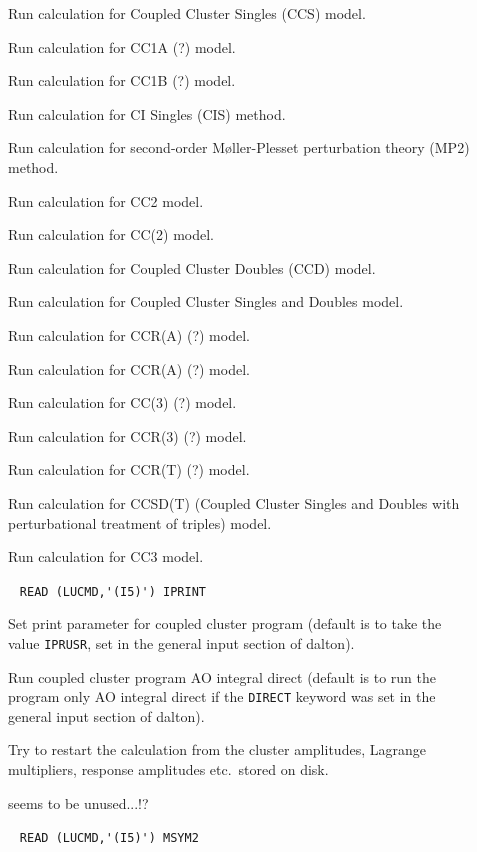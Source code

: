 \begin{description}
\item[] 
        Run calculation for Coupled Cluster Singles (CCS) model. 
%
\item[]   
        Run calculation for CC1A (?) model. 
%
\item[]    
        Run calculation for CC1B (?) model. 
%
\item[]    
        Run calculation for CI Singles (CIS) method. 
%
\item[]    
        Run calculation for second-order M{\o}ller-Plesset 
        perturbation theory (MP2) method. 
%
\item[]    
        Run calculation for CC2 model. 
%
\item[]  
        Run calculation for CC(2) model. 
%
\item[]    
        Run calculation for Coupled Cluster Doubles (CCD) model. 
%
\item[]   
        Run calculation for Coupled Cluster Singles and Doubles model.
%
\item[] 
        Run calculation for CCR(A) (?) model.
%
\item[]  
        Run calculation for CCR(A) (?) model.
%
\item[]  
        Run calculation for CC(3) (?) model.
%
\item[] 
        Run calculation for CCR(3) (?) model.
%
\item[] 
        Run calculation for CCR(T) (?) model.
%
\item[]  
        Run calculation for CCSD(T) (Coupled Cluster Singles and 
        Doubles with perturbational treatment of triples) model.
%
\item[]     
        Run calculation for CC3 model.
%
\item[]  \verb| |\newline
\verb|READ (LUCMD,'(I5)') IPRINT|

       Set print parameter for coupled cluster program
       (default is to take the value \verb+IPRUSR+, set in the general
       input section of dalton).
%
\item[] 
       Run coupled cluster program AO integral direct
       (default is to run the program only AO integral direct
       if the \verb+DIRECT+ keyword was set in the general
       input section of dalton).
%
\item[] 
       Try to restart the calculation from the cluster amplitudes,
       Lagrange multipliers, response amplitudes etc.\ stored on
       disk.
%
\item[] 
       seems to be unused...!?
%
\item[] \verb| |\newline
       \verb|READ (LUCMD,'(I5)') MSYM2|


\end{description}
